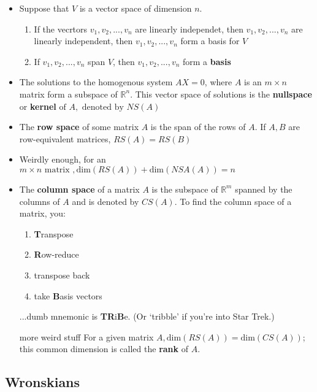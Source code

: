 \documentclass[10pt,letterpaper]{article}
\begin{document}
\begin{itemize}
\item Suppose that $V$ is a vector space of dimension $n$. 
\begin{enumerate}
\item If the vecrtors $v_1,v_2,...,v_n$ are linearly independet, then $v_1,v_2, ...,v_n$ are linearly independent, then $v_1,v_2, ...,v_n$  form a basis for $V$

\item If $v_1,v_2, ...,v_n$ span $V$, then $v_1,v_2, ...,v_n$ form a \textbf{basis}
\end{enumerate}

\item The solutions to the homogenous system $AX=0$, where $A$ is an $m\times n$ matrix form a subspace of $\mathbb{R}^n$. This vector space of solutions is the \textbf{nullspace} or \textbf{kernel}$\mbox{ of } A, \mbox{ denoted by } NS(A)$

\item The \textbf{row space} of some matrix $A$ is the span of the rows of $A$. If $A, B$ are row-equivalent matrices, $RS(A)=RS(B)$

\item Weirdly enough, for an $m\times n \mbox{ matrix },\mbox{dim}(RS(A))+\mbox{dim}(NSA(A))=n$

\item The \textbf{column space} of a matrix $A$ is the subspace of $\mathbb{R}^m$ spanned by the columns of $A$ and is denoted by $CS(A)$. To find the column space of a matrix, you: 
\begin{enumerate}
\item \textbf{T}ranspose 
\item \textbf{R}ow-reduce
\item transpose back 
\item take \textbf{B}asis vectors 
\end{enumerate}
...dumb mnemonic is \textbf{TR}i\textbf{B}e. (Or `tribble' if you're into Star Trek.) 

\item [more weird stuff] For a given matrix $A, \mbox{dim}(RS(A)) = \mbox{dim}(CS(A))$; this common dimension is called the \textbf{rank} of $A$. 

\end{itemize}

\subsection*{Wronskians} %
\end{document}
